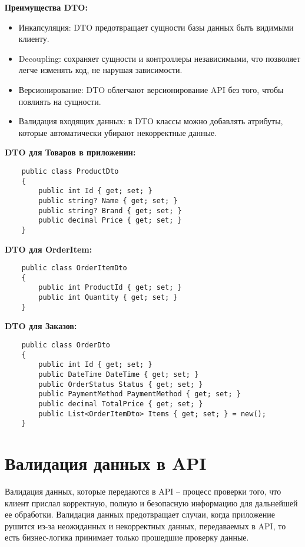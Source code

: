 \documentclass[a4paper,12pt]{report}
\begin{document}
\textbf{Преимущества \acs{DTO}:}
\begin{itemize}
    \item
        Инкапсуляция: \acs{DTO} предотвращает сущности базы данных быть видимыми клиенту.
    \item
        Decoupling: сохраняет сущности и контроллеры независимыми, что позволяет легче изменять
        код, не нарушая зависимости.
    \item
        Версионирование: \acs{DTO} облегчают версионирование \acs{API} без того, чтобы повлиять на сущности.
    \item
        Валидация входящих данных: в \acs{DTO} классы можно добавлять атрибуты, которые автоматически убирают 
        некорректные данные.\cite{dto}
\end{itemize}

\textbf{\acs{DTO} для Товаров в приложении:}

\begin{verbatim}
    public class ProductDto
    {
        public int Id { get; set; } 
        public string? Name { get; set; }
        public string? Brand { get; set; }
        public decimal Price { get; set; }
    }
\end{verbatim}

\textbf{\acs{DTO} для OrderItem:}

\begin{verbatim}
    public class OrderItemDto
    {
        public int ProductId { get; set; }
        public int Quantity { get; set; }
    }
\end{verbatim}

\textbf{\acs{DTO} для Заказов:}

\begin{verbatim}
    public class OrderDto
    {
        public int Id { get; set; }
        public DateTime DateTime { get; set; }
        public OrderStatus Status { get; set; }
        public PaymentMethod PaymentMethod { get; set; }
        public decimal TotalPrice { get; set; }
        public List<OrderItemDto> Items { get; set; } = new();
    }
\end{verbatim}

\section{Валидация данных в \acs{API}}

Валидация данных, которые передаются в \acs{API} -- процесс проверки того, что клиент прислал корректную, полную и безопасную информацию для дальнейшей ее обработки. 
Валидация данных предотвращает случаи, когда приложение рушится из-за неожиданных и некорректных данных, передаваемых в \acs{API}, то есть бизнес-логика принимает 
только прошедшие проверку данные.
\end{document}
